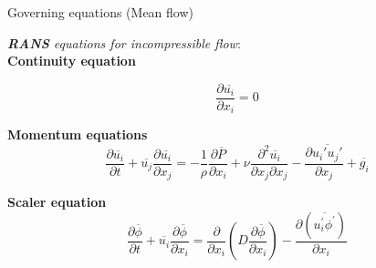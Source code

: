 \documentclass [xcolor=svgnames, t] {beamer}
\begin{document}
\begin{frame}{Governing equations (Mean flow)\autocite{Lecture3}}
  
 \textit{\textbf{RANS} equations for incompressible flow}:\\
  \textbf{Continuity equation}
  
     \begin{equation}
      \frac{\partial \overline{u_{i}}}{\partial x_{i}}=0
  \end{equation} 
  
 
  
  
  \textbf{Momentum equations }
  \begin{equation}
      \frac{\partial \overline{u_{i}} }{\partial t} + \overline{u_{j}} \frac{\partial \overline{u_{i}} }{\partial x_{j}} = -\frac{1}{\rho}\frac{\partial \overline{P}}{\partial x_{i}}+\nu\frac{\partial ^2\overline{u_{i}}}{\partial x_{j}\partial x_{j}}-\frac{\partial \overline{u_{i}'u_{j}'}}{\partial x_{j}}+\overline{g_{i}}
  \end{equation}
  
   \textbf{Scaler equation }
  \begin{equation}
     \frac{\partial \overline{\phi}}{\partial t}+\overline{u_{i}}\frac{\partial \overline{\phi}}{\partial x_{i}}=\frac{\partial}{\partial x_{i}}(D\frac{\partial \overline{\phi}}{\partial x_{i}})-\frac{\partial (\overline{{u_{i}^{'}\phi^{'}}})}{\partial x_{i}}
  \end{equation}
  
  
\end{frame}


\begin{frame}
\author{}
\institute{
	\fontsize{34pt}{34pt}\selectfont
	\textcolor{blue!50!black}{\bf Thank you!}\\[12pt]
	}
\date{
	\normalsize
	Edwin J. Rueda (edwin.rojas@icen.ufpa.br)\\[1pt]
	Federal University of Pará (UFPA)\\[1pt]
	Belém, Pará, Brazil\\
	}
\titlepage
\end{frame}
\end{document}
